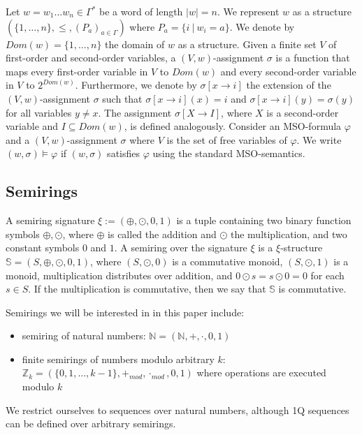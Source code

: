 \documentclass[12pt]{article}
\theoremstyle{definition}
\begin{document}
Let $w = w_1\ldots w_n \in \Gamma^*$ be a word of length $|w| = n$. We represent $w$ as a structure $(\{1,\ldots,n\}, \leq, (P_a)_{a \in \Gamma})$ where $P_a = \{i \ | \ w_i = a\}$. We denote by $Dom(w) = \{1,\ldots,n\}$ the domain of $w$ as a structure. Given a finite set $V$ of first-order and second-order variables, a $(V,w)$-assignment $\sigma$ is a function that maps every first-order variable in $V$ to $Dom(w)$ and every second-order variable in $V$ to $2^{Dom(w)}$. Furthermore, we denote by $\sigma[x \rightarrow i]$ the extension of the $(V,w)$-assignment $\sigma$ such that $\sigma[x \rightarrow i](x) = i$ and $\sigma[x \rightarrow i](y) = \sigma(y)$ for all variables $y \ne x$. The assignment $\sigma[X \rightarrow I]$, where $X$ is a second-order variable and $I \subseteq Dom(w)$, is defined analogously. Consider an MSO-formula $\varphi$ and a $(V,w)$-assignment $\sigma$ where $V$ is the set of free variables of $\varphi$. We write $(w, \sigma) \models \varphi$ if $(w, \sigma)$ satisfies $\varphi$ using the standard MSO-semantics.

\subsection{Semirings}

A semiring signature $\xi := (\oplus, \odot, 0, 1)$ is a tuple containing two binary function symbols $\oplus, \odot$, where $\oplus$ is called the addition and $\odot$ the multiplication, and two constant symbols $0$ and $1$. A semiring over the signature $\xi$ is a $\xi$-structure $\mathbb{S} = (S, \oplus, \odot, 0, 1)$, where $(S, \odot, 0)$ is a commutative monoid, $(S, \odot, 1)$ is a monoid, multiplication distributes over addition, and $0 \odot s = s \odot 0 = 0$ for each $s \in S$. If the multiplication is commutative, then we say that $\mathbb{S}$ is commutative.

Semirings we will be interested in in this paper include:

\begin{itemize}
    \item semiring of natural numbers: $\mathbb{N} = (\mathbb{N}, +, \cdot, 0, 1)$
    \item finite semirings of numbers modulo arbitrary $k$: $ \mathbb{Z}_k = (\{0,1,\ldots,k-1\}, +_{mod}, \cdot_{mod}, 0, 1)$ where operations are executed modulo $k$
\end{itemize}

We restrict ourselves to sequences over natural numbers, although 1Q sequences can be defined over arbitrary semirings.
\end{document}
